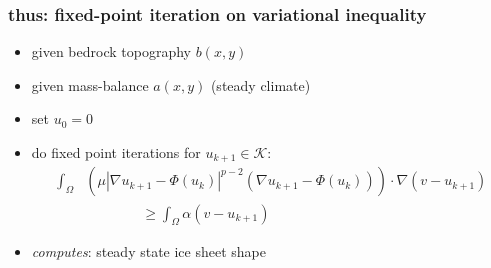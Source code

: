 \documentclass{beamer}
\begin{document}
\begin{frame}
  \frametitle{thus: fixed-point iteration on variational inequality} 

\begin{itemize}
\item given bedrock topography $b(x,y)$
\item given mass-balance $a(x,y)$ (steady climate)
\item set $u_0 = 0$
\item do fixed point iterations for $u_{k+1} \in \mathcal{K}$:
\begin{align*}
\int_{\Omega} &\left( \mu |\nabla u_{k+1} - \Phi(u_k)|^{p-2}
(\nabla u_{k+1} - \Phi(u_k) ) \right) \cdot \nabla (v - u_{k+1}) \\
&\qquad\qquad \ge \int_{\Omega} \alpha (v -  u_{k+1})
\end{align*}

\bigskip
\item \emph{computes}: steady state ice sheet shape
\end{itemize}
\end{frame}
\end{document}
